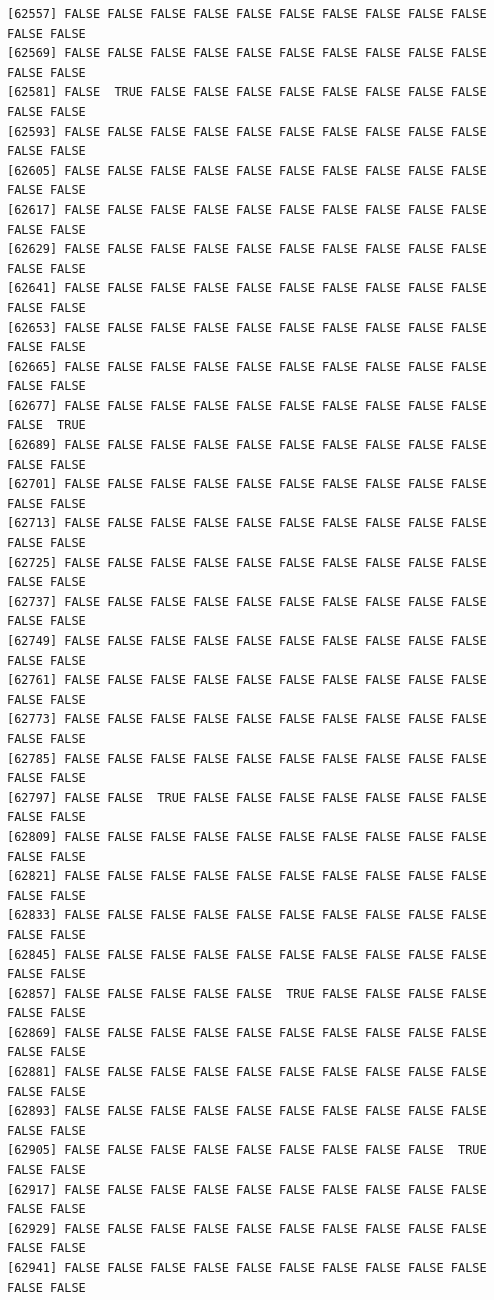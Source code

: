 \documentclass[
  a4paper,
  DIV=11,
  numbers=noendperiod]{scrartcl}
\begin{document}
\begin{verbatim}
[62557] FALSE FALSE FALSE FALSE FALSE FALSE FALSE FALSE FALSE FALSE FALSE FALSE
[62569] FALSE FALSE FALSE FALSE FALSE FALSE FALSE FALSE FALSE FALSE FALSE FALSE
[62581] FALSE  TRUE FALSE FALSE FALSE FALSE FALSE FALSE FALSE FALSE FALSE FALSE
[62593] FALSE FALSE FALSE FALSE FALSE FALSE FALSE FALSE FALSE FALSE FALSE FALSE
[62605] FALSE FALSE FALSE FALSE FALSE FALSE FALSE FALSE FALSE FALSE FALSE FALSE
[62617] FALSE FALSE FALSE FALSE FALSE FALSE FALSE FALSE FALSE FALSE FALSE FALSE
[62629] FALSE FALSE FALSE FALSE FALSE FALSE FALSE FALSE FALSE FALSE FALSE FALSE
[62641] FALSE FALSE FALSE FALSE FALSE FALSE FALSE FALSE FALSE FALSE FALSE FALSE
[62653] FALSE FALSE FALSE FALSE FALSE FALSE FALSE FALSE FALSE FALSE FALSE FALSE
[62665] FALSE FALSE FALSE FALSE FALSE FALSE FALSE FALSE FALSE FALSE FALSE FALSE
[62677] FALSE FALSE FALSE FALSE FALSE FALSE FALSE FALSE FALSE FALSE FALSE  TRUE
[62689] FALSE FALSE FALSE FALSE FALSE FALSE FALSE FALSE FALSE FALSE FALSE FALSE
[62701] FALSE FALSE FALSE FALSE FALSE FALSE FALSE FALSE FALSE FALSE FALSE FALSE
[62713] FALSE FALSE FALSE FALSE FALSE FALSE FALSE FALSE FALSE FALSE FALSE FALSE
[62725] FALSE FALSE FALSE FALSE FALSE FALSE FALSE FALSE FALSE FALSE FALSE FALSE
[62737] FALSE FALSE FALSE FALSE FALSE FALSE FALSE FALSE FALSE FALSE FALSE FALSE
[62749] FALSE FALSE FALSE FALSE FALSE FALSE FALSE FALSE FALSE FALSE FALSE FALSE
[62761] FALSE FALSE FALSE FALSE FALSE FALSE FALSE FALSE FALSE FALSE FALSE FALSE
[62773] FALSE FALSE FALSE FALSE FALSE FALSE FALSE FALSE FALSE FALSE FALSE FALSE
[62785] FALSE FALSE FALSE FALSE FALSE FALSE FALSE FALSE FALSE FALSE FALSE FALSE
[62797] FALSE FALSE  TRUE FALSE FALSE FALSE FALSE FALSE FALSE FALSE FALSE FALSE
[62809] FALSE FALSE FALSE FALSE FALSE FALSE FALSE FALSE FALSE FALSE FALSE FALSE
[62821] FALSE FALSE FALSE FALSE FALSE FALSE FALSE FALSE FALSE FALSE FALSE FALSE
[62833] FALSE FALSE FALSE FALSE FALSE FALSE FALSE FALSE FALSE FALSE FALSE FALSE
[62845] FALSE FALSE FALSE FALSE FALSE FALSE FALSE FALSE FALSE FALSE FALSE FALSE
[62857] FALSE FALSE FALSE FALSE FALSE  TRUE FALSE FALSE FALSE FALSE FALSE FALSE
[62869] FALSE FALSE FALSE FALSE FALSE FALSE FALSE FALSE FALSE FALSE FALSE FALSE
[62881] FALSE FALSE FALSE FALSE FALSE FALSE FALSE FALSE FALSE FALSE FALSE FALSE
[62893] FALSE FALSE FALSE FALSE FALSE FALSE FALSE FALSE FALSE FALSE FALSE FALSE
[62905] FALSE FALSE FALSE FALSE FALSE FALSE FALSE FALSE FALSE  TRUE FALSE FALSE
[62917] FALSE FALSE FALSE FALSE FALSE FALSE FALSE FALSE FALSE FALSE FALSE FALSE
[62929] FALSE FALSE FALSE FALSE FALSE FALSE FALSE FALSE FALSE FALSE FALSE FALSE
[62941] FALSE FALSE FALSE FALSE FALSE FALSE FALSE FALSE FALSE FALSE FALSE FALSE

\end{verbatim}
\end{document}

